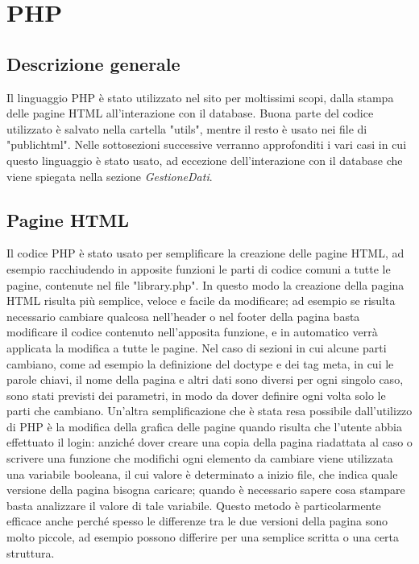 \section{PHP}{
	\subsection{Descrizione generale}{
		Il linguaggio PHP è stato utilizzato nel sito per moltissimi scopi, dalla stampa delle pagine HTML all'interazione con il database. Buona parte del codice utilizzato è salvato nella cartella "utils", mentre il resto è usato nei file di "public\textunderscore html". Nelle sottosezioni successive verranno approfonditi i vari casi in cui questo linguaggio è stato usato, ad eccezione dell'interazione con il database che viene spiegata nella sezione \textit{GestioneDati}.
	}
	\subsection{Pagine HTML}{
		Il codice PHP è stato usato per semplificare la creazione delle pagine HTML, ad esempio racchiudendo in apposite funzioni le parti di codice comuni a tutte le pagine, contenute nel file "library.php". In questo modo la creazione della pagina HTML risulta più semplice, veloce e facile da modificare; ad esempio se risulta necessario cambiare qualcosa nell'header o nel footer della pagina basta modificare il codice contenuto nell'apposita funzione, e in automatico verrà applicata la modifica a tutte le pagine. Nel caso di sezioni in cui alcune parti cambiano, come ad esempio la definizione del doctype e dei tag meta, in cui le parole chiavi, il nome della pagina e altri dati sono diversi per ogni singolo caso, sono stati previsti dei parametri, in modo da dover definire ogni volta solo le parti che cambiano.
		Un'altra semplificazione che è stata resa possibile dall'utilizzo di PHP è la modifica della grafica delle pagine quando risulta che l'utente abbia effettuato il login: anziché dover creare una copia della pagina riadattata al caso o scrivere una funzione che modifichi ogni elemento da cambiare viene utilizzata una variabile booleana, il cui valore è determinato a inizio file, che indica quale versione della pagina bisogna caricare; quando è necessario sapere cosa stampare basta analizzare il valore di tale variabile. Questo metodo è particolarmente efficace anche perché spesso le differenze tra le due versioni della pagina sono molto piccole, ad esempio possono differire per una semplice scritta o una certa struttura.
	}
}
